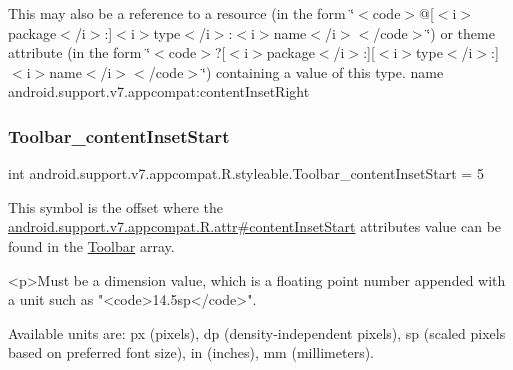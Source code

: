 This may also be a reference to a resource (in the form \char`\"{}$<$code$>$@\mbox{[}$<$i$>$package$<$/i$>$\+:\mbox{]}$<$i$>$type$<$/i$>$\+:$<$i$>$name$<$/i$>$$<$/code$>$\char`\"{}) or theme attribute (in the form \char`\"{}$<$code$>$?\mbox{[}$<$i$>$package$<$/i$>$\+:\mbox{]}\mbox{[}$<$i$>$type$<$/i$>$\+:\mbox{]}$<$i$>$name$<$/i$>$$<$/code$>$\char`\"{}) containing a value of this type.  name android.\+support.\+v7.\+appcompat\+:content\+Inset\+Right \mbox{\label{classandroid_1_1support_1_1v7_1_1appcompat_1_1R_1_1styleable_a57f32786084bf693a66215a7c9de31ca}} 
\subsubsection{\texorpdfstring{Toolbar\+\_\+content\+Inset\+Start}{Toolbar\_contentInsetStart}}
{\footnotesize\ttfamily int android.\+support.\+v7.\+appcompat.\+R.\+styleable.\+Toolbar\+\_\+content\+Inset\+Start = 5\hspace{0.3cm}{\ttfamily [static]}}

This symbol is the offset where the \hyperlink{classandroid_1_1support_1_1v7_1_1appcompat_1_1R_1_1attr_a24763fb35393b1e0a6c6b9057f47fc22}{android.\+support.\+v7.\+appcompat.\+R.\+attr\#content\+Inset\+Start} attribute\textquotesingle{}s value can be found in the \hyperlink{classandroid_1_1support_1_1v7_1_1appcompat_1_1R_1_1styleable_a2daba9587ef9f700f2d54cf13435cb32}{Toolbar} array.

\begin{DoxyVerb}      <p>Must be a dimension value, which is a floating point number appended with a unit such as "<code>14.5sp</code>".
\end{DoxyVerb}
 Available units are\+: px (pixels), dp (density-\/independent pixels), sp (scaled pixels based on preferred font size), in (inches), mm (millimeters). 

